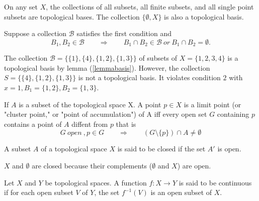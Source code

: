 \begin{example}
On any set $X$, the collections of all subsets, all finite subsets, and all single point subsets are topological bases. The collection $\{\emptyset, X\}$ is also a topological basis.
\end{example}

\begin{lemma}\label{lemmabasis}
Suppose a collection $\mathcal{B}$ satisfies the first condition and
$$B_1, B_2 \in \mathcal{B} \qquad \Rightarrow \qquad B_1\cap B_2\in \mathcal{B} ~or~ B_1\cap B_2=\emptyset.$$
\end{lemma}

\begin{example}
The collection $\mathcal{B}=\{\{1\}, \{4\}, \{1, 2\}, \{1, 3\}\}$ of subsets of $X = \{1, 2, 3, 4\}$ is
a topological basis by lemma (\ref{lemmabasis}). However, the collection $S = \{\{4\}, \{1, 2\}, \{1, 3\}\}$ is not
a topological basis. It violates condition $2$ with $x = 1, B_1 = \{1, 2\}, B_2 = \{1, 3\}$.
\end{example}

\medskip

\begin{definition}
If $A$ is a subset of the topological space X. A point $p\in X$ is a limit point (or "cluster point," or "point of accumulation") of A iff every open set $G$ containing $p$ contains a point of $A$ diffent from $p$ that is
$$ G~open~,p\in G \qquad \Rightarrow \qquad (G\setminus\{p\})\cap A\neq \emptyset $$
\end{definition}


\begin{definition}
A subset $A$ of a topological space $X$ is said to be closed if the set $A'$ is open.
\end{definition}

\begin{example}
$X$ and $\emptyset$ are closed because their complements ($\emptyset$ and $X$) are open.
\end{example}

\begin{definition}
Let $X$ and $Y$ be topological spaces. A function $f : X \rightarrow Y$ is said to be continuous if for each open subset $V$ of $Y$, the set $f^{-1}(V)$ is an open subset of $X$.
\end{definition}


